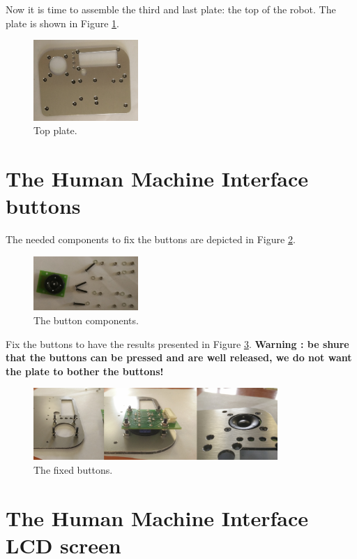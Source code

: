 \documentclass[10pt,a4paper]{report}   %
\begin{document}
Now it is time to assemble the third and last plate: the top of the robot. The plate is shown in Figure \ref{fig:75}.

\begin{figure}[H]
\center
\includegraphics[width=150px]{images/75.jpg}
\caption{Top plate.}
\label{fig:75}
\end{figure}

\section{The Human Machine Interface buttons}

The needed components to fix the buttons are depicted in Figure \ref{fig:76}.

\begin{figure}[H]
\center
\includegraphics[width=150px]{images/76.jpg}
\caption{The button components.}
\label{fig:76}
\end{figure}

Fix the buttons to have the results presented in Figure \ref{fig:77}. \textbf{Warning : be shure that the buttons can be pressed and are well released, we do not want the plate to bother the buttons!}

\begin{figure}[H]
\center
\includegraphics[width=350px]{images/77.jpg}
\caption{The fixed buttons.}
\label{fig:77}
\end{figure}

\section{The Human Machine Interface LCD screen}
\end{document}
